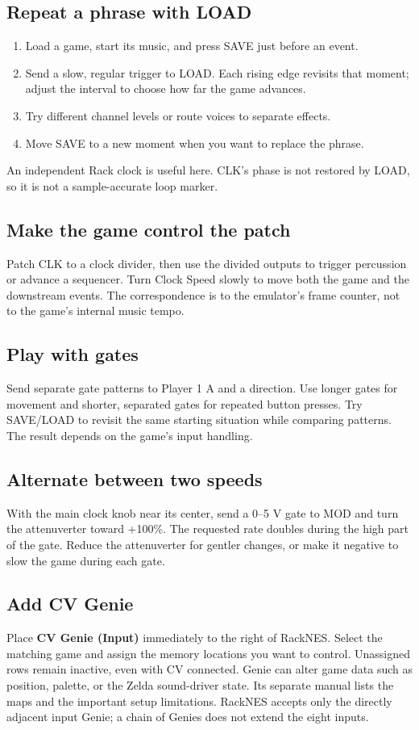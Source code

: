 \subsection{Repeat a phrase with LOAD}
\begin{enumerate}
\item Load a game, start its music, and press SAVE just before an event.
\item Send a slow, regular trigger to LOAD. Each rising edge revisits that
moment; adjust the interval to choose how far the game advances.
\item Try different channel levels or route voices to separate effects.
\item Move SAVE to a new moment when you want to replace the phrase.
\end{enumerate}
An independent Rack clock is useful here. CLK's phase is not restored by
LOAD, so it is not a sample-accurate loop marker.

\subsection{Make the game control the patch}
Patch CLK to a clock divider, then use the divided outputs to trigger
percussion or advance a sequencer. Turn Clock Speed slowly to move both
the game and the downstream events. The correspondence is to the emulator's
frame counter, not to the game's internal music tempo.

\subsection{Play with gates}
Send separate gate patterns to Player 1 A and a direction. Use longer gates
for movement and shorter, separated gates for repeated button presses.
Try SAVE/LOAD to revisit the same starting situation while comparing
patterns. The result depends on the game's input handling.

\subsection{Alternate between two speeds}
With the main clock knob near its center, send a 0--5 V gate to MOD and turn
the attenuverter toward +100\%. The requested rate doubles during the high
part of the gate. Reduce the attenuverter for gentler changes, or make it
negative to slow the game during each gate.

\subsection{Add CV Genie}
Place \textbf{CV Genie (Input)} immediately to the right of RackNES. Select
the matching game and assign the memory locations you want to control.
Unassigned rows remain inactive, even with CV connected. Genie can alter game data such as position, palette, or the
Zelda sound-driver state. Its separate manual lists the maps and the
important setup limitations. RackNES accepts only the directly adjacent
input Genie; a chain of Genies does not extend the eight inputs.
